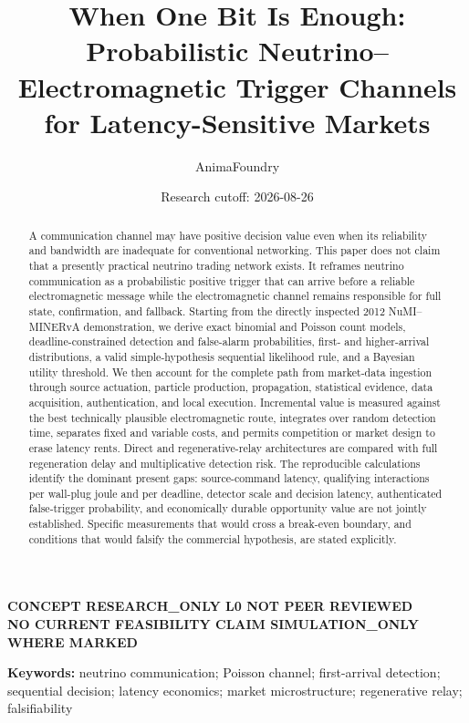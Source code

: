 \documentclass[11pt]{article}
\title{\textbf{When One Bit Is Enough:}\\
Probabilistic Neutrino--Electromagnetic Trigger Channels\\
for Latency-Sensitive Markets}
\author{AnimaFoundry}
\date{Research cutoff: 2026-08-26}
\begin{document}
\maketitle

\begin{center}
\colorbox{statusgray}{\parbox{0.94\linewidth}{\centering\color{statusred}\bfseries
CONCEPT \quad RESEARCH\_ONLY \quad L0 \quad NOT PEER REVIEWED\\
NO CURRENT FEASIBILITY CLAIM \quad SIMULATION\_ONLY WHERE MARKED}}
\end{center}

\begin{abstract}
A communication channel may have positive decision value even when its reliability and bandwidth are inadequate for conventional networking. This paper does not claim that a presently practical neutrino trading network exists. It reframes neutrino communication as a probabilistic positive trigger that can arrive before a reliable electromagnetic message while the electromagnetic channel remains responsible for full state, confirmation, and fallback. Starting from the directly inspected 2012 NuMI--MINERvA demonstration, we derive exact binomial and Poisson count models, deadline-constrained detection and false-alarm probabilities, first- and higher-arrival distributions, a valid simple-hypothesis sequential likelihood rule, and a Bayesian utility threshold. We then account for the complete path from market-data ingestion through source actuation, particle production, propagation, statistical evidence, data acquisition, authentication, and local execution. Incremental value is measured against the best technically plausible electromagnetic route, integrates over random detection time, separates fixed and variable costs, and permits competition or market design to erase latency rents. Direct and regenerative-relay architectures are compared with full regeneration delay and multiplicative detection risk. The reproducible calculations identify the dominant present gaps: source-command latency, qualifying interactions per wall-plug joule and per deadline, detector scale and decision latency, authenticated false-trigger probability, and economically durable opportunity value are not jointly established. Specific measurements that would cross a break-even boundary, and conditions that would falsify the commercial hypothesis, are stated explicitly.
\end{abstract}

\noindent\textbf{Keywords:} neutrino communication; Poisson channel; first-arrival detection; sequential decision; latency economics; market microstructure; regenerative relay; falsifiability
\end{document}
